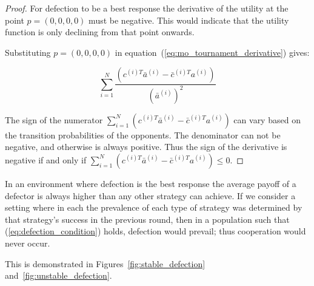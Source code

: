 \documentclass[10pt]{article}
\begin{document}
\begin{proof}
    For defection to be a best response the derivative of the utility
    at the point \(p = (0, 0, 0, 0)\) must be negative. This would indicate that
    the utility function is only declining from that point onwards.

    Substituting \(p = (0, 0, 0, 0)\) in
    equation~(\ref{eq:mo_tournament_derivative}) gives:

    \begin{equation}
    \sum_{i=1} ^ N \frac{(c^{(i)T} \bar{a}^{(i)} - \bar{c}^{(i)T} a^{(i)})}
    {(\bar{a}^{(i)})^2}
    \end{equation}

    The sign of the numerator \( \displaystyle\sum_{i=1} ^ N (c^{(i)T} \bar{a}^{(i)} - \bar{c}^{(i)T} a^{(i)})\)
    can vary based on the transition probabilities of the opponents.
    The denominator can not be negative, and otherwise is always positive.
    Thus the sign of the derivative is negative if and only if
    \( \displaystyle\sum_{i=1} ^ N (c^{(i)T} \bar{a}^{(i)} - \bar{c}^{(i)T} a^{(i)}) \leq 0\).
\end{proof}

In an environment where defection is the best response the average payoff of
a defector is always higher than any other strategy can achieve. If we consider
a setting where in each the prevalence of each type of strategy was determined
by that strategy's success in the previous round, then in a population such that
(\ref{eq:defection_condition}) holds, defection would prevail;
thus cooperation would never occur.

This is demonstrated in Figures~\ref{fig:stable_defection} and~\ref{fig:unstable_defection}.
\end{document}
